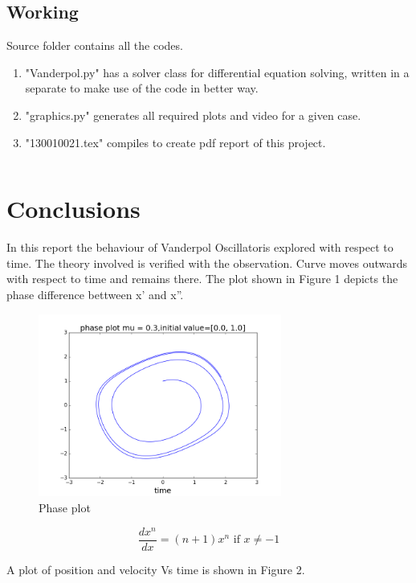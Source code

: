 \documentclass[a4paper]{article}
\begin{document}
\subsection{Working}
Source folder contains all the codes. 
\begin{enumerate}
\item "Vanderpol.py" has a solver class for differential equation solving, written in a separate to make use of the code in better way.
\item "graphics.py" generates all required plots and video for a given case. 
\item "130010021.tex" compiles to create pdf report of this project.
\end{enumerate}
\begin{verbatim}
\end{verbatim}

\section{Conclusions}
In this report the behaviour of Vanderpol Oscillatoris explored with respect to time. The theory involved is verified with the observation. Curve moves outwards with respect to time and remains there. The plot shown in Figure 1 depicts the phase difference bettween x' and x''.

\begin{figure}[!htbp]
\begin{center}
\includegraphics[width=8cm]{../output/phase_plot.png}
\end{center}
\caption{Phase plot}\label{lines}
\end{figure}

$$\frac{dx^n}{dx}=(n+1)x^{n}\text{ if }x\ne-1$$

A plot of position and velocity Vs time is shown in Figure 2.
\end{document}
